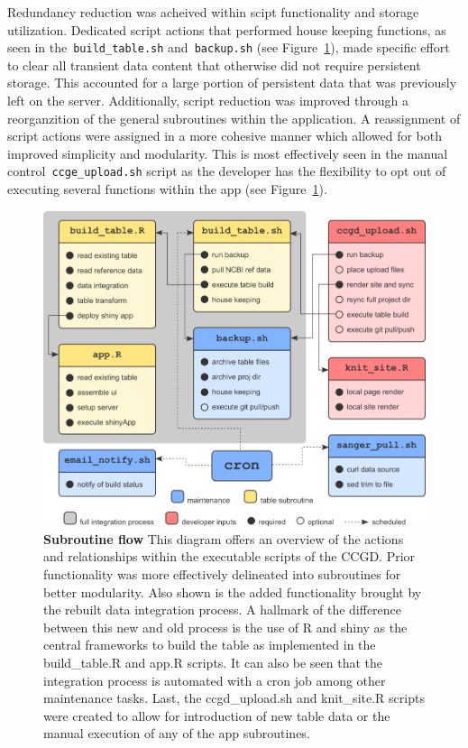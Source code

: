 \documentclass[10pt]{report}
\begin{document}
Redundancy reduction was acheived within scipt functionality and storage utilization. Dedicated script actions that performed house keeping functions, as seen in the~\texttt{build\_table.sh} and~\texttt{backup.sh} (see Figure~\ref{fig:subroutine}), made specific effort to clear all transient data content that otherwise did not require persistent storage. This accounted for a large portion of persistent data that was previously left on the server. Additionally, script reduction was improved through a reorganzition of the general subroutines within the application. A reassignment of script actions were assigned in a more cohesive manner which allowed for both improved simplicity and modularity. This is most effectively seen in the manual control~\texttt{ccge\_upload.sh} script as the developer has the flexibility to opt out of executing several functions within the app (see Figure~\ref{fig:subroutine}).

\begin{figure}[H]
    \centering
    \includegraphics[width=\textwidth]{fig/subroutine_flow.png}
    \caption[Subroutine flow]{\textbf{Subroutine flow} This diagram offers an overview of the actions and relationships within the executable scripts of the CCGD\@. Prior functionality was more effectively delineated into subroutines for better modularity. Also shown is the added functionality brought by the rebuilt data integration process. A hallmark of the difference between this new and old process is the use of R and shiny as the central frameworks to build the table as implemented in the build\_table.R and app.R scripts. It can also be seen that the integration process is automated with a cron job among other maintenance tasks. Last, the ccgd\_upload.sh and knit\_site.R scripts were created to allow for introduction of new table data or the manual execution of any of the app subroutines.}\label{fig:subroutine}
\end{figure}
\end{document}
